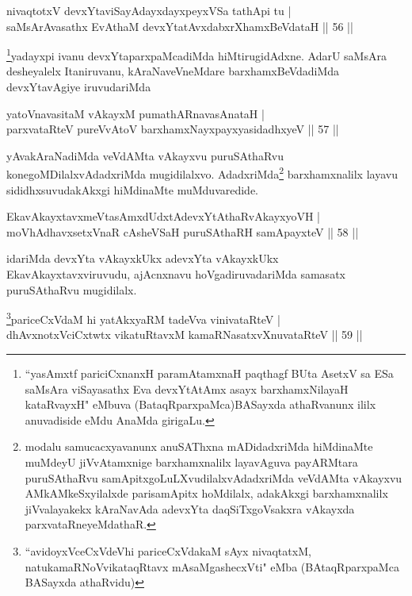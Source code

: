 \begin{shl}
nivaqtotxV devxYtaviSayAdayxdayxpeyxVSa tathA\s pi tu |\\
saMsArAvasathx EvAthaM devxYtatAvxdabxrXhamxBeVdataH \hfill || 56 ||
\end{shl}

\begin{artha}
\footnote{``yasAmxtf pariciCxnanxH paramAtamxnaH paqthagf BUta AsetxV sa ESa saMsAra viSayasathx Eva devxYtAtAmx asayx barxhamxNilayaH kataRvayxH" eMbuva (BataqRparxpaMca)BASayxda athaRvanunx ililx anuvadiside eMdu AnaMda girigaLu.}yadayxpi ivanu devxYtaparxpaMcadiMda hiMtirugidAdxne. AdarU saMsAra desheyalelx Itaniruvanu, kAraNaveVneMdare barxhamxBeVdadiMda devxYtavAgiye iruvudariMda
\end{artha}

\begin{shl}
yatoV\s navasitaM vAkayxM pumathARnavasAnataH |\\
parxvataRteV pureVvAtoV barxhamxNayxpayxyasidadhxyeV \hfill || 57 ||
\end{shl}

\begin{artha}
yAvakAraNadiMda veVdAMta vAkayxvu puruSAthaRvu konegoMDilalxvAdadxriMda mugidilalxvo. AdadxriMda\footnote{modalu samucacxyavanunx anuSAThxna mADidadxriMda hiMdinaMte muMdeyU jiVvAtamxnige barxhamxnalilx layavAguva payARMtara puruSAthaRvu samApitxgoLuLXvudilalxvAdadxriMda veVdAMta vAkayxvu AMkAMkeSxyilalxde parisamApitx hoMdilalx, adakAkxgi barxhamxnalilx jiVvalayakekx kAraNavAda adevxYta daqSiTxgoVsakxra vAkayxda parxvataRneyeMdathaR.} barxhamxnalilx layavu sididhxsuvudakAkxgi hiMdinaMte muMduvaredide.
\end{artha}

\begin{shl}
EkavAkayxtavxmeVtasAmxdUdxtAdevxYtAthaRvAkayxyoVH |\\
moVhAdhavxsetxVnaR cAsheVSaH puruSAthaRH samApayxteV \hfill || 58 ||
\end{shl}

\begin{artha}
idariMda devxYta vAkayxkUkx adevxYta vAkayxkUkx EkavAkayxtavxviruvudu, ajAcnxnavu hoVgadiruvadariMda samasatx puruSAthaRvu mugidilalx.
\end{artha}

\begin{shl}
\footnote{``avidoyxVceCxVdeVhi pariceCxVdakaM sAyx nivaqtatxM, natukamaRNoVvikataqRtavx mAsaMgashecxVti" eMba (BAtaqRparxpaMca BASayxda athaRvidu)}pariceCxVdaM hi yatAkxyaRM tadeVva vinivataRteV |\\
dhAvxnotxVciCxtwtx vikatuRtavxM kamaRNasatxvXnuvataRteV \hfill || 59 ||
\end{shl}

